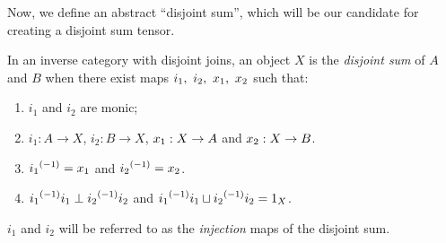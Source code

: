 Now, we define an abstract ``disjoint sum'', which will be our candidate for creating a disjoint sum
tensor.
\begin{definition}\label{def:disjoint_sum}
  In an inverse category with disjoint joins, an object $X$ is the \emph{disjoint sum} of $A$ and
  $B$ when there exist maps $i_1,\ i_2,\ \xa,\ \xb$ such that:
  \begin{enumerate}[{(}i{)}]
    \item $i_1$ and $i_2$ are monic;
    \item $i_1 : A \to X$, $i_2: B \to X$, $x_1: X \to A$ and $x_2: X \to B$.
    \item ${i_1}^{(-1)} = x_1$ and ${i_2}^{(-1)} = x_2$.
    \item ${i_1}^{(-1)}i_1 \perp {i_2}^{(-1)}i_2$ and ${i_1}^{(-1)}i_1 \sqcup {i_2}^{(-1)}i_2 = 1_X$.
  \end{enumerate}
  $i_1$ and $i_2$ will be referred to as the \emph{injection} maps of the disjoint sum.
\end{definition}

